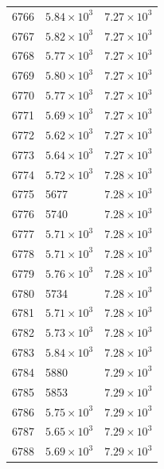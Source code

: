 \begin{table}[H]
\begin{tabular}{lll}
6766 & $\displaystyle 5.84 \times 10^{3}$ & $\displaystyle 7.27 \times 10^{3}$ \\
6767 & $\displaystyle 5.82 \times 10^{3}$ & $\displaystyle 7.27 \times 10^{3}$ \\
6768 & $\displaystyle 5.77 \times 10^{3}$ & $\displaystyle 7.27 \times 10^{3}$ \\
6769 & $\displaystyle 5.80 \times 10^{3}$ & $\displaystyle 7.27 \times 10^{3}$ \\
6770 & $\displaystyle 5.77 \times 10^{3}$ & $\displaystyle 7.27 \times 10^{3}$ \\
6771 & $\displaystyle 5.69 \times 10^{3}$ & $\displaystyle 7.27 \times 10^{3}$ \\
6772 & $\displaystyle 5.62 \times 10^{3}$ & $\displaystyle 7.27 \times 10^{3}$ \\
6773 & $\displaystyle 5.64 \times 10^{3}$ & $\displaystyle 7.27 \times 10^{3}$ \\
6774 & $\displaystyle 5.72 \times 10^{3}$ & $\displaystyle 7.28 \times 10^{3}$ \\
6775 & 5677 & $\displaystyle 7.28 \times 10^{3}$ \\
6776 & 5740 & $\displaystyle 7.28 \times 10^{3}$ \\
6777 & $\displaystyle 5.71 \times 10^{3}$ & $\displaystyle 7.28 \times 10^{3}$ \\
6778 & $\displaystyle 5.71 \times 10^{3}$ & $\displaystyle 7.28 \times 10^{3}$ \\
6779 & $\displaystyle 5.76 \times 10^{3}$ & $\displaystyle 7.28 \times 10^{3}$ \\
6780 & 5734 & $\displaystyle 7.28 \times 10^{3}$ \\
6781 & $\displaystyle 5.71 \times 10^{3}$ & $\displaystyle 7.28 \times 10^{3}$ \\
6782 & $\displaystyle 5.73 \times 10^{3}$ & $\displaystyle 7.28 \times 10^{3}$ \\
6783 & $\displaystyle 5.84 \times 10^{3}$ & $\displaystyle 7.28 \times 10^{3}$ \\
6784 & 5880 & $\displaystyle 7.29 \times 10^{3}$ \\
6785 & 5853 & $\displaystyle 7.29 \times 10^{3}$ \\
6786 & $\displaystyle 5.75 \times 10^{3}$ & $\displaystyle 7.29 \times 10^{3}$ \\
6787 & $\displaystyle 5.65 \times 10^{3}$ & $\displaystyle 7.29 \times 10^{3}$ \\
6788 & $\displaystyle 5.69 \times 10^{3}$ & $\displaystyle 7.29 \times 10^{3}$ \\

\end{tabular}
\end{table}
